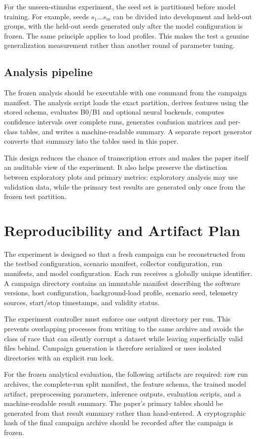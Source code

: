 \documentclass[sigconf,review]{acmart}
\begin{document}
For the unseen-stimulus experiment, the seed set is partitioned before model training. For example, seeds $s_1\ldots s_m$ can be divided into development and held-out groups, with the held-out seeds generated only after the model configuration is frozen. The same principle applies to load profiles. This makes the test a genuine generalization measurement rather than another round of parameter tuning.

\subsection{Analysis pipeline}
The frozen analysis should be executable with one command from the campaign manifest. The analysis script loads the exact partition, derives features using the stored schema, evaluates B0/B1 and optional neural backends, computes confidence intervals over complete runs, generates confusion matrices and per-class tables, and writes a machine-readable summary. A separate report generator converts that summary into the tables used in this paper.

This design reduces the chance of transcription errors and makes the paper itself an auditable view of the experiment. It also helps preserve the distinction between exploratory plots and primary metrics: exploratory analysis may use validation data, while the primary test results are generated only once from the frozen test partition.

\section{Reproducibility and Artifact Plan}
The experiment is designed so that a fresh campaign can be reconstructed from the testbed configuration, scenario manifest, collector configuration, run manifests, and model configuration. Each run receives a globally unique identifier. A campaign directory contains an immutable manifest describing the software versions, host configuration, background-load profile, scenario seed, telemetry sources, start/stop timestamps, and validity status.

The experiment controller must enforce one output directory per run. This prevents overlapping processes from writing to the same archive and avoids the class of race that can silently corrupt a dataset while leaving superficially valid files behind. Campaign generation is therefore serialized or uses isolated directories with an explicit run lock.

For the frozen analytical evaluation, the following artifacts are required: raw run archives, the complete-run split manifest, the feature schema, the trained model artifact, preprocessing parameters, inference outputs, evaluation scripts, and a machine-readable result summary. The paper's primary tables should be generated from that result summary rather than hand-entered. A cryptographic hash of the final campaign archive should be recorded after the campaign is frozen.
\end{document}
